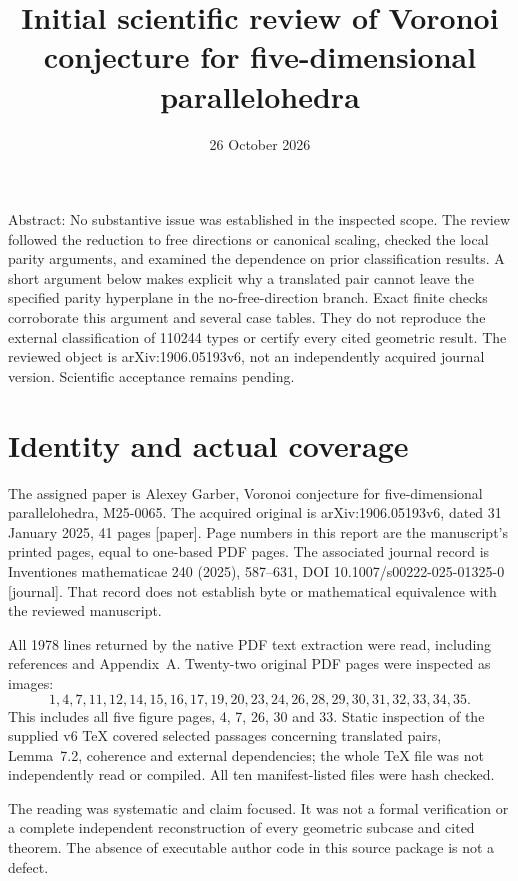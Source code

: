 \documentclass[10pt]{article}
\title{Initial scientific review of
Voronoi conjecture for five-dimensional parallelohedra}
\author{}
\date{26 October 2026}
\begin{document}
\maketitle
Abstract: No substantive issue was established in the inspected scope. The review followed the reduction to free directions or canonical scaling, checked the local parity arguments, and examined the dependence on prior classification results. A short argument below makes explicit why a translated pair cannot leave the specified parity hyperplane in the no-free-direction branch. Exact finite checks corroborate this argument and several case tables. They do not reproduce the external classification of 110244 types or certify every cited geometric result. The reviewed object is arXiv:1906.05193v6, not an independently acquired journal version. Scientific acceptance remains pending.\par
\section*{Identity and actual coverage}
The assigned paper is Alexey Garber, Voronoi conjecture for five-dimensional parallelohedra, M25-0065. The acquired original is arXiv:1906.05193v6, dated 31 January 2025, 41 pages [paper]. Page numbers in this report are the manuscript’s printed pages, equal to one-based PDF pages. The associated journal record is Inventiones mathematicae 240 (2025), 587–631, DOI 10.1007/s00222-025-01325-0 [journal]. That record does not establish byte or mathematical equivalence with the reviewed manuscript.\par
All 1978 lines returned by the native PDF text extraction were read, including references and Appendix A. Twenty-two original PDF pages were inspected as images: \[1,4,7,11,12,14,15,16,17,19,20,23,24,26,28,29,30,31,32,33,34,35.\] This includes all five figure pages, 4, 7, 26, 30 and 33. Static inspection of the supplied v6 TeX covered selected passages concerning translated pairs, Lemma 7.2, coherence and external dependencies; the whole TeX file was not independently read or compiled. All ten manifest-listed files were hash checked.\par
The reading was systematic and claim focused. It was not a formal verification or a complete independent reconstruction of every geometric subcase and cited theorem. The absence of executable author code in this source package is not a defect.\par
\end{document}
